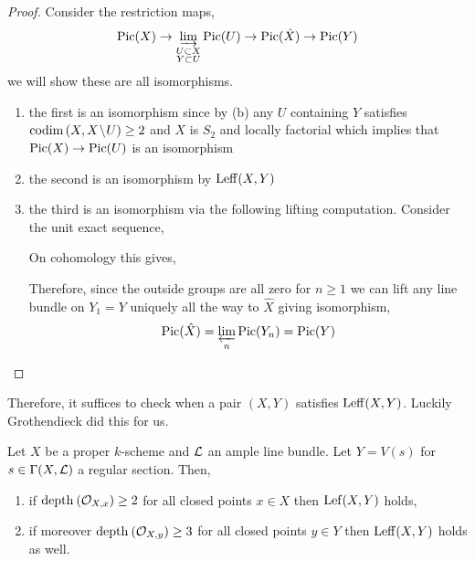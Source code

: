 \documentclass[12pt]{article}
\begin{document}
\begin{proof}
Consider the restriction maps,
\[ \mathrm{Pic}(X) \to \operatorname*{\varinjlim}_{\substack{U \subset X \\ Y \subset U}} \mathrm{Pic}(U) \to \mathrm{Pic}(\hat{X}) \to \mathrm{Pic}(Y) \]
we will show these are all isomorphisms. 
\begin{enumerate}
\item the first is an isomorphism since by (b) any $U$ containing $Y$ satisfies $\mathrm{codim}\left( X,X \! \setminus \! U \right) \ge 2$ and $X$ is $S_2$ and locally factorial which implies that $\mathrm{Pic}(X) \to \mathrm{Pic}(U)$ is an isomorphism

\item the second is an isomorphism by $\mathrm{Leff}(X,Y)$
\item the third is an isomorphism via the following lifting computation. Consider the unit exact sequence,
\begin{center}
\end{center}
On cohomology this gives,
\begin{center}
\end{center}
Therefore, since the outside groups are all zero for $n \ge 1$ we can lift any line bundle on $Y_1 = Y$ uniquely all the way to $\hat{X}$ giving isomorphism,
\[ \mathrm{Pic}(\hat{X}) = \operatorname*{\varprojlim}_n \mathrm{Pic}(Y_n) = \mathrm{Pic}(Y) \]
\end{enumerate}
\end{proof}

Therefore, it suffices to check when a pair $(X, Y)$ satisfies $\mathrm{Leff}(X,Y)$. Luckily Grothendieck did this for us.

\begin{theorem}
Let $X$ be a proper $k$-scheme and $\mathcal{L}$ an ample line bundle. Let $Y = V(s)$ for $s \in \Gamma(X, \mathcal{L})$ a regular section. Then,
\begin{enumerate}
\item if $\mathrm{depth}_{} \left( \mathcal{O}_{X, x} \right) \ge 2$ for all closed points $x \in X$ then $\mathrm{Lef}(X,Y)$ holds,
\item if moreover $\mathrm{depth}_{} \left( \mathcal{O}_{X, y} \right) \ge 3$ for all closed points $y \in Y$ then $\mathrm{Leff}(X,Y)$ holds as well.
\end{enumerate}
\end{theorem}
\end{document}
